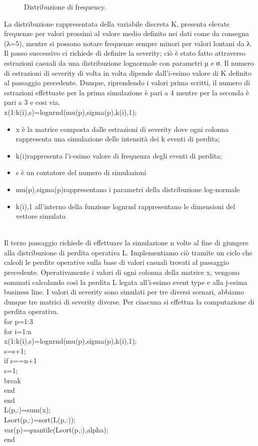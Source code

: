\documentclass[titlepage]{article}
\begin{document}
\begin{itemize}
{\begin{figure}[htbp]
	\caption{\label{fig:frog}Distribuzione di frequency.}
\end{figure}
La distribuzione rappresentata della variabile discreta K, presenta elevate frequenze per valori prossimi al valore medio definito nei dati come da consegna (λ=5), mentre si possono notare frequenze sempre minori per valori lontani da λ.
\\
Il passo successivo ci richiede di definire la severity; ciò è stato fatto attraverso estrazioni casuali da una distribuzione lognormale con parametri µ e σ. Il numero di estrazioni di severity di volta in volta dipende dall’i-esimo valore di K definito al passaggio precedente. Dunque, riprendendo i valori prima scritti, il numero di estrazioni effettuate per la prima simulazione è pari a 4 mentre per la seconda è pari a 3 e cosi via.
\\
x(1:k(i),s)=lognrnd(mu(p),sigma(p),k(i),1);
\begin{itemize}
\item x è la matrice composta dalle estrazioni di severity dove ogni colonna rappresenta una simulazione delle intensità dei k eventi di perdita;
\item k(i)rappresenta l’i-esimo valore di frequenza degli eventi di perdita;
\item s è un contatore del numero di simulazioni 
\item mu(p),sigma(p)rappresentano i parametri della distribuzione log-normale
\item k(i),1 all’interno della funzione lognrnd rappresentano le dimensioni del vettore simulato
\end{itemize}
\\
Il terzo passaggio richiede di effettuare la simulazione n volte al fine di giungere alla distribuzione di perdita operativa L. Implementiamo ciò tramite un ciclo che calcoli le perdite operative sulla base di valori casuali trovati al passaggio precedente. Operativamente i valori di ogni colonna della matrice x, vengono sommati calcolando così la perdita L legata all'i-esimo event type e alla j-esima business line. I valori di severity sono simulati per tre diversi scenari, abbiamo dunque tre matrici di severity diverse. Per ciascuna si effettua la computazione di perdita operativa.
\\

for p=1:3
\\
for i=1:n
\\
x(1:k(i),s)=lognrnd(mu(p),sigma(p),k(i),1);
\\
s=s+1;     
\\
if s==n+1
\\
s=1;
\\
break
\\
end
\\
end
\\
L(p,:)=sum(x); 
\\
Lsort(p,:)=sort(L(p,:));
\\
 var(p)=quantile(Lsort(p,:),alpha);
\\
end
\\

}
\end{itemize}
\end{document}
